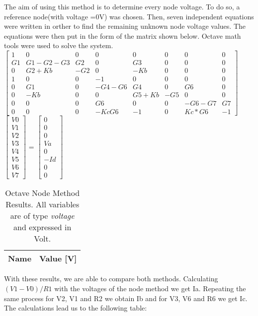 The aim of using this method is to determine every node voltage. To do so, a reference node(with voltage =0V) was chosen. Then, seven independent equations were written in orther to find the remaining unknown node voltage values. The equations were then put in the form of the matrix shown below. Octave math tools were used to solve the system.\\


$\begin{bmatrix}
1 & 0 & 0 & 0 & 0 & 0 & 0 & 0\\
G1 & G1-G2-G3 & G2 & 0 & G3 & 0 & 0 & 0\\
0 & G2+Kb & -G2 & 0 & -Kb & 0 & 0 & 0\\
1 & 0 & 0 & -1 & 0 & 0 & 0 & 0\\
0 & G1 & 0 & -G4-G6 & G4 & 0 & G6 & 0\\
0 & -Kb & 0 & 0 & G5+Kb & -G5 & 0 & 0\\
0 & 0 & 0 & G6 & 0 & 0 & -G6-G7 & G7\\
0 & 0 & 0 & -KcG6 & -1 & 0 & Kc*G6 & -1
\end{bmatrix}$
$\begin{bmatrix}
V0 \\ V1 \\ V2 \\ V3 \\ V4 \\ V5 \\ V6 \\ V7
\end{bmatrix}$
= 
$\begin{bmatrix}
0 \\ 0 \\ 0 \\ Va \\ 0 \\ -Id \\ 0 \\ 0
\end{bmatrix}$

\begin{table}[ht]
  \centering
  \begin{tabular}{|l|r|}
    \hline    
    {\bf Name} & {\bf Value [V]} \\ \hline
    
  \end{tabular}
  \caption{Octave Node Method Results. All variables are of type {\it voltage} and expressed in
    Volt.}
  \label{tab:nos}
\end{table}


\par With these results, we are able to compare both methods. Calculating $(V1-V0)/R1$ with the voltages of the node method we get Ia. Repeating the same process for V2, V1 and R2 we obtain Ib and for V3, V6 and R6 we get Ic. The calculations lead us to the following table:


